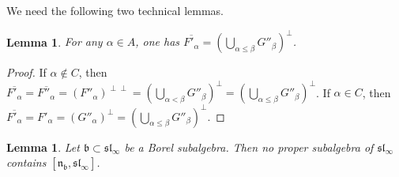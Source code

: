 \documentclass{article}
\def\b{\mathfrak {b}}
\def\n{\mathfrak {n}}
\def\sl{\mathfrak{sl}}
\newtheorem{lemma}[thm]{Lemma}
\begin{document}
We need the following two technical lemmas. 


\begin{lemma} \label{orderingproperty}
For any $\alpha \in A$, one has
$\overline{F'_\alpha} = (\bigcup_{\alpha \leq \beta} G''_\beta)^\perp$.
\end{lemma}

\begin{proof}
If $\alpha \notin C$, then $\overline{F'_\alpha} = \overline{F''_\alpha} = (F''_\alpha)^{\perp \perp} = ( \bigcup_{\alpha < \beta} G''_\beta)^\perp = ( \bigcup_{\alpha \leq \beta} G''_\beta)^\perp$.  If $\alpha \in C$, then $\overline{F'_\alpha} = F'_\alpha = (G''_\alpha)^\perp = (\bigcup_{\alpha \leq \beta} G''_\beta)^\perp$.  
\end{proof}


\begin{lemma}\label{recoverslinfty}
Let $\b \subset \sl_\infty$ be a Borel subalgebra. Then no proper subalgebra of $\sl_\infty$ contains $[\n_\b, \sl_\infty]$.
\end{lemma}
\end{document}
